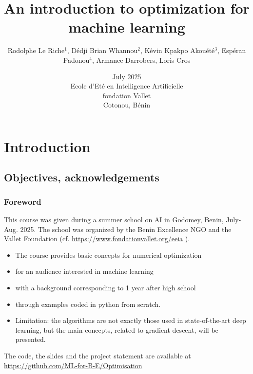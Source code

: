 \documentclass[12pt]{beamer}
\begin{document}
\title
[~Optimization for machine learning
]
{An introduction to optimization for machine learning}
\author
[Le Riche et al.]
{\normalsize Rodolphe Le Riche$^1$, Dédji Brian Whannou$^2$, Kévin Kpakpo Akouété$^3$, Espéran Padonou$^4$, Armance Darrobers, Loris Cros} 
\date[July 2025]{July 2025 \\
Ecole d'Eté en Intelligence Artificielle \\
fondation Vallet\\
Cotonou, Bénin} 
\begin{frame}
\titlepage
\end{frame}

\section{Introduction}
\subsection{Objectives, acknowledgements}

\begin{frame}
\frametitle{Foreword}
This course was given during a summer school on AI in Godomey, Benin, July-Aug. 2025.
The school was organized by the Benin Excellence NGO and the Vallet Foundation (cf. 
{\scriptsize
\url{https://www.fondationvallet.org/eeia}}
).
\begin{itemize}
\item The course provides basic concepts for numerical optimization
\item for an audience interested in machine learning
\item with a background corresponding to 1 year after high school
\item through examples coded in python from scratch.
\item Limitation: the algorithms are not exactly those used in state-of-the-art deep learning, but the main concepts, related to gradient descent, will be presented.
\end{itemize}
The code, the slides and the project statement are available at {\scriptsize \url{https://github.com/ML-for-B-E/Optimisation}}
\end{frame}
\end{document}
